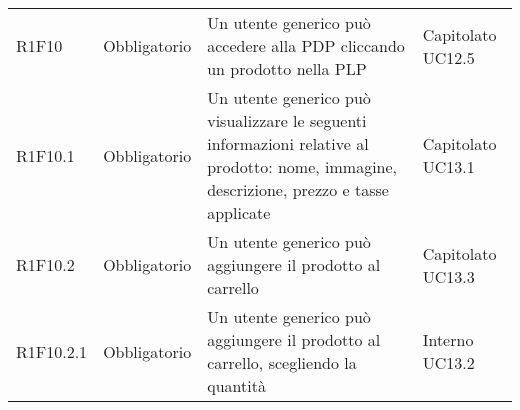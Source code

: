 {\begin{longtable}{C{2.5cm} C{2.8cm} C{6.7cm} C{2.5cm}}

R1F10 & Obbligatorio & Un utente generico può accedere alla PDP cliccando un prodotto nella PLP & Capitolato \newline UC12.5\\
R1F10.1 & Obbligatorio & Un utente generico può visualizzare le seguenti informazioni relative al prodotto: nome, immagine, descrizione, prezzo e tasse applicate & Capitolato \newline UC13.1\\
R1F10.2 & Obbligatorio & Un utente generico può aggiungere il prodotto al carrello & Capitolato \newline UC13.3\\
R1F10.2.1 & Obbligatorio & Un utente generico può aggiungere il prodotto al carrello, scegliendo la quantità & Interno \newline UC13.2 \\

\end{longtable}

}